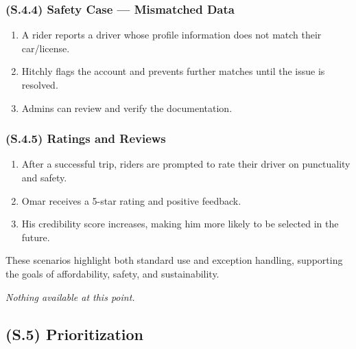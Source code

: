 \documentclass[12pt,letterpaper]{article}
\begin{document}
\subsubsection{(S.4.4) Safety Case — Mismatched Data} %
\begin{enumerate}
    \item A rider reports a driver whose profile information does not match their car/license.
    \item Hitchly flags the account and prevents further matches until the issue is resolved.
    \item Admins can review and verify the documentation.
\end{enumerate}

\subsubsection{(S.4.5) Ratings and Reviews} %
\begin{enumerate}
    \item After a successful trip, riders are prompted to rate their driver on punctuality and safety.
    \item Omar receives a 5-star rating and positive feedback.
    \item His credibility score increases, making him more likely to be selected in the future.
\end{enumerate}

These scenarios highlight both standard use and exception handling, supporting the goals of affordability, safety, and sustainability.

\textit{Nothing available at this point.}

\subsection{(S.5) Prioritization}

\end{document}
